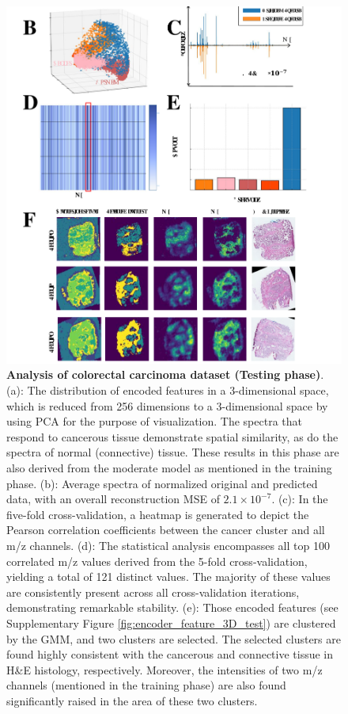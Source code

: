 \documentclass{WileyMSP-template}
\begin{document}
\begin{figure}
  \centering
  \includegraphics[width=\textwidth]{pic/color_test.pdf}
\captionsetup{justification=raggedright,singlelinecheck=false}
\caption
  {
    \textbf{Analysis of colorectal carcinoma dataset (Testing phase)}. 
    (a): The distribution of encoded features in a 3-dimensional space, which is reduced from 256 dimensions to a 3-dimensional space by using PCA for the purpose of visualization. 
    The spectra that respond to cancerous tissue 
    demonstrate spatial similarity, as do the spectra of normal (connective) tissue. These results in this phase are also derived from the moderate model as mentioned in the training phase. 
    (b): Average spectra of normalized original and 
    predicted data, with an overall reconstruction MSE of $2.1\times 10^{-7}$. 
    (c): In the five-fold cross-validation, 
    a heatmap is generated to depict the Pearson correlation coefficients between the 
    cancer cluster and all m/z channels. 
    (d): The statistical analysis encompasses all top 100 correlated m/z values 
    derived from the 5-fold cross-validation, yielding a total of 121 distinct values. 
    The majority of these values are consistently present across all 
    cross-validation iterations, demonstrating remarkable stability. 
    (e): Those encoded features (see Supplementary Figure \ref{fig:encoder_feature_3D_test}) 
    are clustered by the GMM, 
    and two clusters are selected.
    The selected clusters are found highly consistent 
    with the cancerous and connective tissue in H\&E histology, respectively. 
    Moreover, the intensities of two m/z channels (mentioned in the training phase) are also 
    found significantly raised in the area of these two clusters. 
  }



\label{fig:Testing}
\end{figure}
\end{document}
